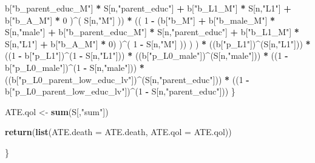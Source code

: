 \documentclass[
]{book}
\newenvironment{Shaded}{\begin{snugshade}}{\end{snugshade}}
\newcommand{\AttributeTok}[1]{\textcolor[rgb]{0.13,0.29,0.53}{#1}}
\newcommand{\DecValTok}[1]{\textcolor[rgb]{0.00,0.00,0.81}{#1}}
\newcommand{\FunctionTok}[1]{\textcolor[rgb]{0.13,0.29,0.53}{\textbf{#1}}}
\newcommand{\NormalTok}[1]{#1}
\newcommand{\OtherTok}[1]{\textcolor[rgb]{0.56,0.35,0.01}{#1}}
\newcommand{\SpecialCharTok}[1]{\textcolor[rgb]{0.81,0.36,0.00}{\textbf{#1}}}
\newcommand{\StringTok}[1]{\textcolor[rgb]{0.31,0.60,0.02}{#1}}
\begin{document}
\begin{Shaded}
\begin{Highlighting}[]
\NormalTok{                             b[}\StringTok{"b\_parent\_educ\_M"}\NormalTok{] }\SpecialCharTok{*}\NormalTok{ S[n,}\StringTok{"parent\_educ"}\NormalTok{] }\SpecialCharTok{+} 
\NormalTok{                             b[}\StringTok{"b\_L1\_M"}\NormalTok{] }\SpecialCharTok{*}\NormalTok{ S[n,}\StringTok{"L1"}\NormalTok{] }\SpecialCharTok{+}
\NormalTok{                             b[}\StringTok{"b\_A\_M"}\NormalTok{] }\SpecialCharTok{*} \DecValTok{0}\NormalTok{ )}\SpecialCharTok{\^{}}\NormalTok{( S[n,}\StringTok{"M"}\NormalTok{] )) }\SpecialCharTok{*}
\NormalTok{                        (( }\DecValTok{1} \SpecialCharTok{{-}}\NormalTok{ (b[}\StringTok{"b\_M"}\NormalTok{] }\SpecialCharTok{+} 
\NormalTok{                                  b[}\StringTok{"b\_male\_M"}\NormalTok{] }\SpecialCharTok{*}\NormalTok{ S[n,}\StringTok{"male"}\NormalTok{] }\SpecialCharTok{+} 
\NormalTok{                                  b[}\StringTok{"b\_parent\_educ\_M"}\NormalTok{] }\SpecialCharTok{*}\NormalTok{ S[n,}\StringTok{"parent\_educ"}\NormalTok{] }\SpecialCharTok{+} 
\NormalTok{                                  b[}\StringTok{"b\_L1\_M"}\NormalTok{] }\SpecialCharTok{*}\NormalTok{ S[n,}\StringTok{"L1"}\NormalTok{] }\SpecialCharTok{+}
\NormalTok{                                  b[}\StringTok{"b\_A\_M"}\NormalTok{] }\SpecialCharTok{*} \DecValTok{0}\NormalTok{) )}\SpecialCharTok{\^{}}\NormalTok{( }\DecValTok{1} \SpecialCharTok{{-}}\NormalTok{ S[n,}\StringTok{"M"}\NormalTok{] )) ) ) }\SpecialCharTok{*}
\NormalTok{    ((b[}\StringTok{"p\_L1"}\NormalTok{])}\SpecialCharTok{\^{}}\NormalTok{(S[n,}\StringTok{"L1"}\NormalTok{])) }\SpecialCharTok{*}
\NormalTok{    ((}\DecValTok{1} \SpecialCharTok{{-}}\NormalTok{ b[}\StringTok{"p\_L1"}\NormalTok{])}\SpecialCharTok{\^{}}\NormalTok{(}\DecValTok{1} \SpecialCharTok{{-}}\NormalTok{ S[n,}\StringTok{"L1"}\NormalTok{])) }\SpecialCharTok{*}
\NormalTok{    ((b[}\StringTok{"p\_L0\_male"}\NormalTok{])}\SpecialCharTok{\^{}}\NormalTok{(S[n,}\StringTok{"male"}\NormalTok{])) }\SpecialCharTok{*} 
\NormalTok{    ((}\DecValTok{1} \SpecialCharTok{{-}}\NormalTok{ b[}\StringTok{"p\_L0\_male"}\NormalTok{])}\SpecialCharTok{\^{}}\NormalTok{(}\DecValTok{1} \SpecialCharTok{{-}}\NormalTok{ S[n,}\StringTok{"male"}\NormalTok{])) }\SpecialCharTok{*} 
\NormalTok{    ((b[}\StringTok{"p\_L0\_parent\_low\_educ\_lv"}\NormalTok{])}\SpecialCharTok{\^{}}\NormalTok{(S[n,}\StringTok{"parent\_educ"}\NormalTok{])) }\SpecialCharTok{*}
\NormalTok{    ((}\DecValTok{1} \SpecialCharTok{{-}}\NormalTok{ b[}\StringTok{"p\_L0\_parent\_low\_educ\_lv"}\NormalTok{])}\SpecialCharTok{\^{}}\NormalTok{(}\DecValTok{1} \SpecialCharTok{{-}}\NormalTok{ S[n,}\StringTok{"parent\_educ"}\NormalTok{])) }
\NormalTok{\}}

\NormalTok{ATE.qol }\OtherTok{\textless{}{-}} \FunctionTok{sum}\NormalTok{(S[,}\StringTok{"sum"}\NormalTok{])}

\FunctionTok{return}\NormalTok{(}\FunctionTok{list}\NormalTok{(}\AttributeTok{ATE.death =}\NormalTok{ ATE.death, }\AttributeTok{ATE.qol =}\NormalTok{ ATE.qol))}
  
\NormalTok{\}}
\end{Highlighting}
\end{Shaded}
\end{document}
